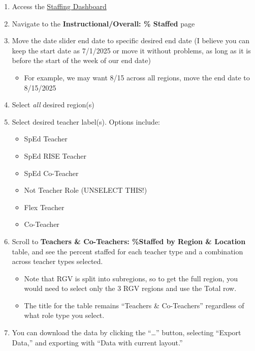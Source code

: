 \documentclass[
  letterpaper,
  DIV=11,
  numbers=noendperiod]{scrreprt}
\providecommand{\tightlist}{%
  \setlength{\itemsep}{0pt}\setlength{\parskip}{0pt}}
\begin{document}
\begin{enumerate}
\def\labelenumi{\arabic{enumi}.}
\tightlist
\item
  Access the
  \href{https://app.powerbi.com/groups/me/reports/a5d80984-d4e3-411d-b301-900ac1c790ad/ac6eda202eb561291ee5?experience=power-bi}{Staffing
  Dashboard}
\item
  Navigate to the \textbf{Instructional/Overall: \% Staffed} page
\item
  Move the date slider end date to specific desired end date (I believe
  you can keep the start date as 7/1/2025 or move it without problems,
  as long as it is before the start of the week of our end date)

  \begin{itemize}
  \tightlist
  \item
    For example, we may want 8/15 across all regions, move the end date
    to 8/15/2025
  \end{itemize}
\item
  Select \emph{all} desired region(s)
\item
  Select desired teacher label(s). Options include:

  \begin{itemize}
  \tightlist
  \item
    SpEd Teacher
  \item
    SpEd RISE Teacher
  \item
    SpEd Co-Teacher
  \item
    Not Teacher Role (UNSELECT THIS!)
  \item
    Flex Teacher
  \item
    Co-Teacher
  \end{itemize}
\item
  Scroll to \textbf{Teachers \& Co-Teachers: \%Staffed by Region \&
  Location} table, and see the percent staffed for each teacher type and
  a combination across teacher types selected.

  \begin{itemize}
  \tightlist
  \item
    Note that RGV is split into subregions, so to get the full region,
    you would need to select only the 3 RGV regions and use the Total
    row.
  \item
    The title for the table remains ``Teachers \& Co-Teachers''
    regardless of what role type you select.
  \end{itemize}
\item
  You can download the data by clicking the ``\ldots{}'' button,
  selecting ``Export Data,'' and exporting with ``Data with current
  layout.''
\end{enumerate}
\end{document}
